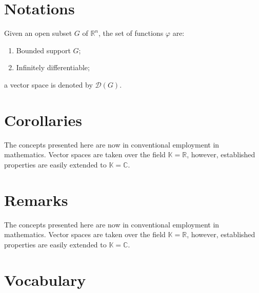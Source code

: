 \documentclass[
12pt, %
a4paper, %
fleqn,   %
]{notes}
\begin{document}
\section{Notations}
\begin{notation}
    Given an open subset $G$ of $\mathbb{R}^n$, the set of functions $\varphi$ are:
    \begin{enumerate}
        \item Bounded support $G$;
        \item Infinitely differentiable;
    \end{enumerate}
    a vector space is denoted by $\mathcal{D}(G)$. 
\end{notation}


\section{Corollaries}
\begin{corollary}
    The concepts presented here are now in conventional employment in
    mathematics. Vector spaces are taken over the field $\mathbb{K}=\mathbb{R}$,
    however, established properties are easily extended to
    $\mathbb{K}=\mathbb{C}$.
\end{corollary}


\section{Remarks}
\begin{remark}
    The concepts presented here are now in conventional employment in
    mathematics. Vector spaces are taken over the field $\mathbb{K}=\mathbb{R}$,
    however, established properties are easily extended to
    $\mathbb{K}=\mathbb{C}$.
\end{remark}


\section{Vocabulary}
\end{document}
